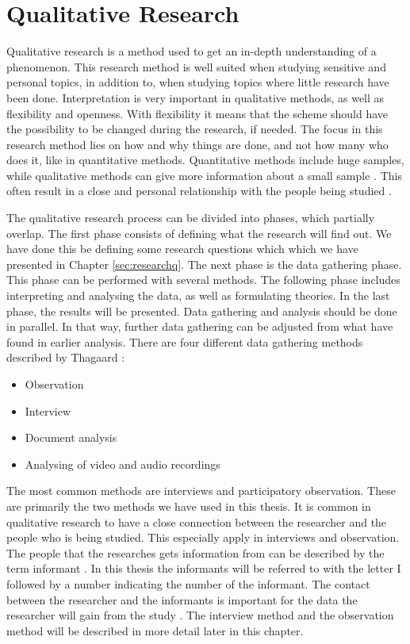 \section{Qualitative Research}
Qualitative research is a method used to get an in-depth understanding of a phenomenon. This research method is well suited when studying sensitive and personal topics, in addition to, when studying topics where little research have been done. Interpretation is very important in qualitative methods, as well as flexibility and openness. With flexibility it means that the scheme should have the possibility to be changed during the research, if needed. The focus in this research method lies on how and why things are done, and not how many who does it, like in quantitative methods. Quantitative methods include huge samples, while qualitative methods can give more information about a small sample \cite{qualitative}. This often result in a close and personal relationship with the people being studied \cite{tjora}.  

The qualitative research process can be divided into phases, which partially overlap. The first phase consists of defining what the research will find out. We have done this be defining some research questions which which we have presented in Chapter \ref{sec:researchq}. The next phase is the data gathering phase. This phase can be performed with several methods. The following phase includes interpreting and analysing the data, as well as formulating theories. In the last phase, the results will be presented. Data gathering and analysis should be done in parallel. In that way, further data gathering can be adjusted from what have found in earlier analysis. There are four different data gathering methods described by Thagaard \cite{qualitative}:

\begin{itemize}
\item Observation 
\item Interview  
\item Document analysis
\item Analysing of video and audio recordings
\end{itemize}

The most common methods are interviews and participatory observation. These are primarily the two methods we have used in this thesis. It is common in qualitative research to have a close connection between the researcher and the people who is being studied. This especially apply in interviews and observation. The people that the researches gets information from can be described by the term informant \cite{qualitative}.  In this thesis the informants will be referred to with the letter I followed by a number indicating the number of the informant. The contact between the researcher and the informants is important for the data the researcher will gain from the study \cite{qualitative}. The interview method and the observation method will be described in more detail later in this chapter.

